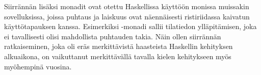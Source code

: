 \documentclass[finnish]{tktltiki2}
\begin{document}
Siirrännän lisäksi monadit ovat otettu Haskellissa käyttöön monissa muissakin sovelluksissa, joissa
puhtaus ja laiskuus ovat näennäisesti ristiriidassa kaivatun käyttötapauksen kanssa. Esimerkiksi
-monadi sallii tilatiedon ylläpitämisen, joka ei tavallisesti olisi mahdollista
puhtauden takia. Näin ollen siirrännän ratkaiseminen, joka oli eräs merkittävistä haasteista
Haskellin kehityksen alkuaikona, on vaikuttanut merkittävällä tavalla kielen kehitykseen myös
myöhempinä vuosina.











\end{document}
